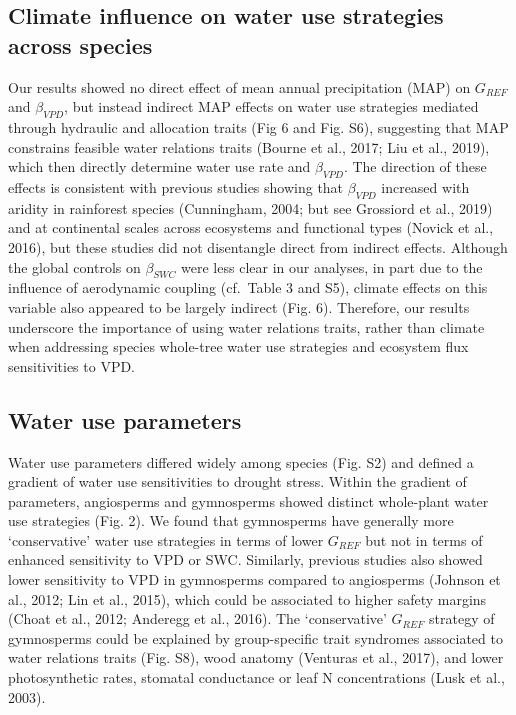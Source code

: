 \documentclass[11pt,twoside]{reedthesis}
\begin{document}
\subsection{Climate influence on water use strategies across
species}\label{climate-influence-on-water-use-strategies-across-species}

Our results showed no direct effect of mean annual precipitation (MAP)
on \(G_{REF}\) and \(\beta_{VPD}\), but instead indirect MAP effects on
water use strategies mediated through hydraulic and allocation traits
(Fig 6 and Fig. S6), suggesting that MAP constrains feasible water
relations traits (Bourne et al., 2017; Liu et al., 2019), which then
directly determine water use rate and \(\beta_{VPD}\). The direction of
these effects is consistent with previous studies showing that
\(\beta_{VPD}\) increased with aridity in rainforest species
(Cunningham, 2004; but see Grossiord et al., 2019) and at continental
scales across ecosystems and functional types (Novick et al., 2016), but
these studies did not disentangle direct from indirect effects. Although
the global controls on \(\beta_{SWC}\) were less clear in our analyses,
in part due to the influence of aerodynamic coupling (cf.~Table 3 and
S5), climate effects on this variable also appeared to be largely
indirect (Fig. 6). Therefore, our results underscore the importance of
using water relations traits, rather than climate when addressing
species whole-tree water use strategies and ecosystem flux sensitivities
to VPD.\par

\subsection{Water use parameters}\label{water-use-parameters}

Water use parameters differed widely among species (Fig. S2) and defined
a gradient of water use sensitivities to drought stress. Within the
gradient of parameters, angiosperms and gymnosperms showed distinct
whole-plant water use strategies (Fig. 2). We found that gymnosperms
have generally more `conservative' water use strategies in terms of
lower \(G_{REF}\) but not in terms of enhanced sensitivity to VPD or
SWC. Similarly, previous studies also showed lower sensitivity to VPD in
gymnosperms compared to angiosperms (Johnson et al., 2012; Lin et al.,
2015), which could be associated to higher safety margins (Choat et al.,
2012; Anderegg et al., 2016). The `conservative' \(G_{REF}\) strategy of
gymnosperms could be explained by group-specific trait syndromes
associated to water relations traits (Fig. S8), wood anatomy (Venturas
et al., 2017), and lower photosynthetic rates, stomatal conductance or
leaf N concentrations (Lusk et al., 2003).\par
\end{document}
